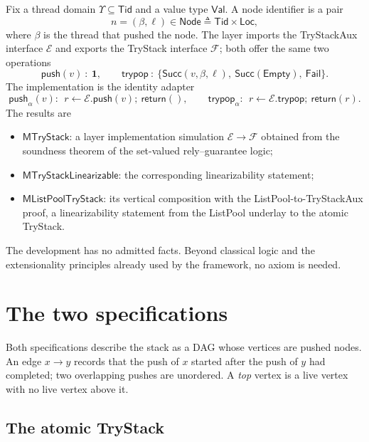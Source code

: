 \documentclass[11pt]{article}
\theoremstyle{definition}
\theoremstyle{remark}
\newcommand{\Tid}{\mathsf{Tid}}
\newcommand{\Loc}{\mathsf{Loc}}
\newcommand{\Val}{\mathsf{Val}}
\newcommand{\Node}{\mathsf{Node}}
\newcommand{\Push}{\mathsf{push}}
\newcommand{\TryPop}{\mathsf{trypop}}
\newcommand{\Succ}{\mathsf{Succ}}
\newcommand{\Fail}{\mathsf{Fail}}
\newcommand{\Empty}{\mathsf{Empty}}
\begin{document}
Fix a thread domain \(\Upsilon\subseteq\Tid\) and a value type \(\Val\).  A
node identifier is a pair
\[
  n=(\beta,\ell)\in\Node\triangleq\Tid\times\Loc,
\]
where \(\beta\) is the thread that pushed the node.  The layer imports the
TryStackAux interface \(\mathcal E\) and exports the TryStack interface
\(\mathcal F\); both offer the same two operations
\[
  \Push(v)\ :\ \mathbf 1,\qquad
  \TryPop\ :\ \{\Succ(v,\beta,\ell),\ \Succ(\Empty),\ \Fail\}.
\]
The implementation is the identity adapter
\[
  \Push_\alpha(v):\ \ r\leftarrow\mathcal E.\Push(v);\ \mathsf{return}(),
  \qquad
  \TryPop_\alpha:\ \ r\leftarrow\mathcal E.\TryPop;\ \mathsf{return}(r).
\]
The results are
\begin{itemize}[nosep]
\item \(\mathsf{MTryStack}\): a layer implementation simulation
  \(\mathcal E\to\mathcal F\) obtained from the soundness theorem of the
  set-valued rely--guarantee logic;
\item \(\mathsf{MTryStackLinearizable}\): the corresponding linearizability
  statement;
\item \(\mathsf{MListPoolTryStack}\): its vertical composition with the
  ListPool-to-TryStackAux proof, a linearizability statement from the
  ListPool underlay to the atomic TryStack.
\end{itemize}
The development has no admitted facts.  Beyond classical logic and the
extensionality principles already used by the framework, no axiom is needed.

\section{The two specifications}

Both specifications describe the stack as a DAG whose vertices are pushed
nodes.  An edge \(x\to y\) records that the push of \(x\) started after the
push of \(y\) had completed; two overlapping pushes are unordered.  A
\emph{top} vertex is a live vertex with no live vertex above it.

\subsection{The atomic TryStack}
\end{document}

